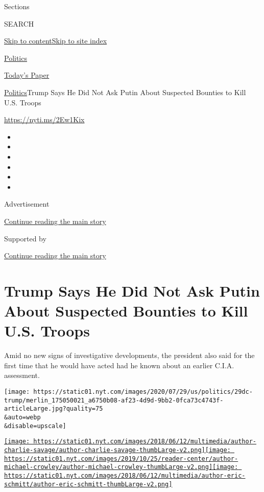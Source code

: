 Sections

SEARCH

\protect\hyperlink{site-content}{Skip to
content}\protect\hyperlink{site-index}{Skip to site index}

\href{https://www.nytimes.com/section/politics}{Politics}

\href{https://myaccount.nytimes.com/auth/login?response_type=cookie\&client_id=vi}{}

\href{https://www.nytimes.com/section/todayspaper}{Today's Paper}

\href{/section/politics}{Politics}\textbar{}Trump Says He Did Not Ask
Putin About Suspected Bounties to Kill U.S. Troops

\href{https://nyti.ms/2Ew1Kix}{https://nyti.ms/2Ew1Kix}

\begin{itemize}
\item
\item
\item
\item
\item
\item
\end{itemize}

Advertisement

\protect\hyperlink{after-top}{Continue reading the main story}

Supported by

\protect\hyperlink{after-sponsor}{Continue reading the main story}

\hypertarget{trump-says-he-did-not-ask-putin-about-suspected-bounties-to-kill-us-troops}{%
\section{Trump Says He Did Not Ask Putin About Suspected Bounties to
Kill U.S.
Troops}\label{trump-says-he-did-not-ask-putin-about-suspected-bounties-to-kill-us-troops}}

Amid no new signs of investigative developments, the president also said
for the first time that he would have acted had he known about an
earlier C.I.A. assessment.

\texttt{[image: https://static01.nyt.com/images/2020/07/29/us/politics/29dc-trump/merlin\_175050021\_a6750b08-af23-4d9d-9bb2-0fca73c4743f-articleLarge.jpg?quality=75\\\&auto=webp\\\&disable=upscale]}

\href{https://www.nytimes.com/by/charlie-savage}{\texttt{[image: https://static01.nyt.com/images/2018/06/12/multimedia/author-charlie-savage/author-charlie-savage-thumbLarge-v2.png]}}\href{https://www.nytimes.com/by/michael-crowley}{\texttt{[image: https://static01.nyt.com/images/2019/10/25/reader-center/author-michael-crowley/author-michael-crowley-thumbLarge-v2.png]}}\href{https://www.nytimes.com/by/eric-schmitt}{\texttt{[image: https://static01.nyt.com/images/2018/06/12/multimedia/author-eric-schmitt/author-eric-schmitt-thumbLarge-v2.png]}}

